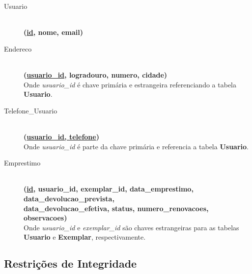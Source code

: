 \documentclass[12pt,a4paper]{article}
\begin{document}
\begin{conceptbox}
\begin{description}
    \item[Usuario] \hfill \\
    \textbf{(\underline{id}, nome, email)}
    
    \item[Endereco] \hfill \\
    \textbf{(\underline{usuario\_id}, logradouro, numero, cidade)} \\
    Onde \textit{usuario\_id} é chave primária e estrangeira referenciando a tabela \textbf{Usuario}.
    
    \item[Telefone\_Usuario] \hfill \\
    \textbf{(\underline{usuario\_id, telefone})} \\
    Onde \textit{usuario\_id} é parte da chave primária e referencia a tabela \textbf{Usuario}.
    
    \item[Emprestimo] \hfill \\
    \textbf{(\underline{id}, usuario\_id, exemplar\_id, data\_emprestimo, data\_devolucao\_prevista,} \\
    \textbf{data\_devolucao\_efetiva, status, numero\_renovacoes, observacoes)} \\
    Onde \textit{usuario\_id} e \textit{exemplar\_id} são chaves estrangeiras para as tabelas \textbf{Usuario} e \textbf{Exemplar}, respectivamente.
\end{description}
\end{conceptbox}

\subsection{Restrições de Integridade}
\end{document}
